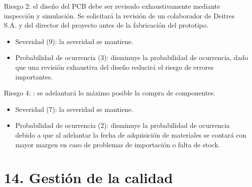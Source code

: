 \documentclass[
11pt, %
]{charter}
\begin{document}
Riesgo 2:  el diseño del PCB debe ser revisado exhaustivamente mediante inspección y simulación. Se solicitará la revisión de un colaborador de Deitres S.A. y del director del proyecto antes de la fabricación del prototipo.
  \begin{itemize}
	\item Severidad (9): la severidad se mantiene.
	\item Probabilidad de ocurrencia (3):  disminuye la probabilidad de ocurrencia, dado que una revisión exhaustiva del diseño reducirá el riesgo de errores importantes.
	\end{itemize}

Riesgo 4: : se adelantará lo máximo posible la compra de componentes.
  \begin{itemize}
	\item Severidad (7): la severidad se mantiene.
	\item Probabilidad de ocurrencia (2):  disminuye la probabilidad de ocurrencia debido a que al adelantar la fecha de adquisición de materiales se contará con mayor margen en caso de problemas de importación o falta de stock.
	\end{itemize}


\section{14. Gestión de la calidad}
\label{sec:calidad}
\end{document}
